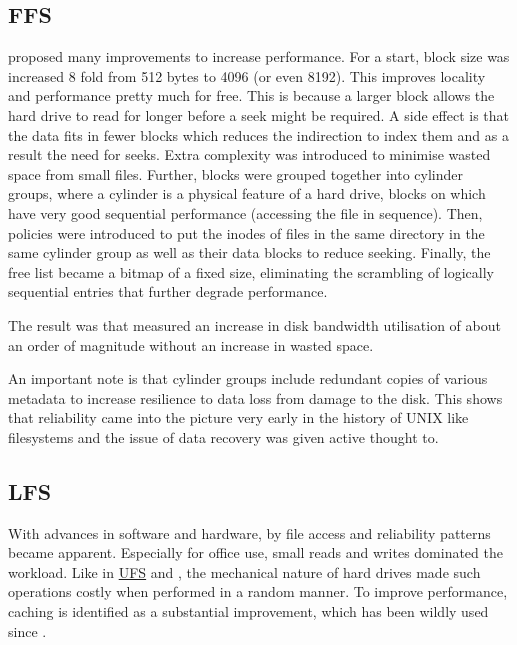         \subsection{FFS}
            \label{sec:FFS}

             proposed many improvements to increase
            performance. For a start, block size was increased 8 fold from 512
            bytes to 4096 (or even 8192). This improves locality and
            performance pretty much for free. This is because a larger block
            allows the hard drive to read for longer before a seek might be
            required. A side effect is that the data fits in fewer blocks which
            reduces the indirection to index them and as a result the need for
            seeks. Extra complexity was introduced to minimise wasted space
            from small files. Further, blocks were grouped together into
            cylinder groups, where a cylinder is a physical feature of a hard
            drive, blocks on which have very good sequential performance
            (accessing the file in sequence). Then, policies were introduced to
            put the inodes of files in the same directory in the same cylinder
            group as well as their data blocks to reduce seeking. Finally, the
            free list became a bitmap of a fixed size, eliminating the
            scrambling of logically sequential entries that further degrade
            performance.

            The result was that  measured an increase in disk
            bandwidth utilisation of about an order of magnitude without an
            increase in wasted space.

            An important note is that cylinder groups include redundant copies
            of various metadata to increase resilience to data loss from damage
            to the disk. This shows that reliability came into the picture very
            early in the history of UNIX like filesystems and the issue of data
            recovery was given active thought to.

        \subsection{LFS}
            \label{sec:LFS}

            With advances in software and hardware, by 
            file access and reliability patterns became apparent. Especially
            for office use, small reads and writes dominated the workload. Like
            in \hyperref[sec:UFS]{UFS} and , the mechanical
            nature of hard drives made such operations costly when performed in
            a random manner. To improve performance, caching is identified as
            a substantial improvement, which has been wildly used since
            \cite{IO_bottleneck, Linux_VFS_cache}.

